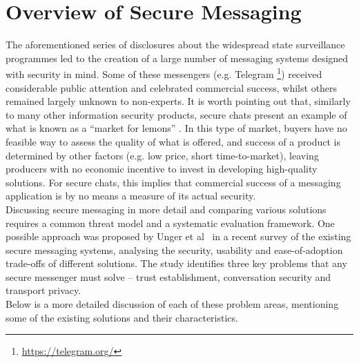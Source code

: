 \documentclass[a4paper, 12pt]{report}
\begin{document}
\section{Overview of Secure Messaging}
The aforementioned series of disclosures about the widespread state surveillance programmes led to the creation of a large number of messaging systems designed with security in mind. Some of these messengers (e.g. Telegram \footnote{\url{https://telegram.org/}}) received considerable public attention and celebrated commercial success, whilst others remained largely unknown to non-experts. It is worth pointing out that, similarly to many other information security products, secure chats present an example of what is known as a ``market for lemons'' \cite{akerlof1970lemons} \cite{anderson2001information}. In this type of market, buyers have no feasible way to assess the quality of what is offered, and success of a product is determined by other factors (e.g. low price, short time-to-market), leaving producers with no economic incentive to invest in developing high-quality solutions. For secure chats, this implies that commercial success of a messaging application is by no means a measure of its actual security. \\ 

Discussing secure messaging in more detail and comparing various solutions requires a common threat model and a systematic evaluation framework. One possible approach was proposed by Unger et al~\cite{unger2015sok} in a recent survey of the existing secure messaging systems, analysing the security, usability and ease-of-adoption trade-offs of different solutions. The study identifies three key problems that any secure messenger must solve -- trust establishment, conversation security and transport privacy. \\


Below is a more detailed discussion of each of these problem areas, mentioning some of the existing solutions and their characteristics.
\end{document}
